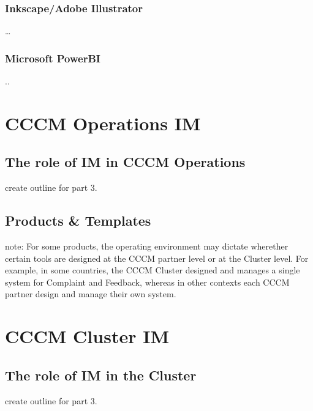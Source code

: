 \documentclass[letterpaper,10pt,english]{jupyterBook}
\begin{document}
\section{Inkscape/Adobe Illustrator}
\label{\detokenize{part1/tools:inkscape-adobe-illustrator}}
\sphinxAtStartPar
…


\section{Microsoft PowerBI}
\label{\detokenize{part1/tools:microsoft-powerbi}}
\sphinxAtStartPar
..


\part{CCCM Operations IM}


\chapter{The role of IM in CCCM Operations}
\label{\detokenize{part2/operations:the-role-of-im-in-cccm-operations}}\label{\detokenize{part2/operations::doc}}
\sphinxAtStartPar
{} create outline for part 3.


\chapter{Products \& Templates}
\label{\detokenize{part2/products:products-templates}}\label{\detokenize{part2/products::doc}}
\sphinxAtStartPar
note: For some products, the operating environment may dictate wherether certain tools are designed at the CCCM partner level or at the Cluster level. For example, in some countries, the CCCM Cluster designed and manages a single system for Complaint and Feedback, whereas in other contexts each CCCM partner design and manage their own system.


\part{CCCM Cluster IM}


\chapter{The role of IM in the Cluster}
\label{\detokenize{part3/cluster:the-role-of-im-in-the-cluster}}\label{\detokenize{part3/cluster::doc}}
\sphinxAtStartPar
{} create outline for part 3.
\end{document}
